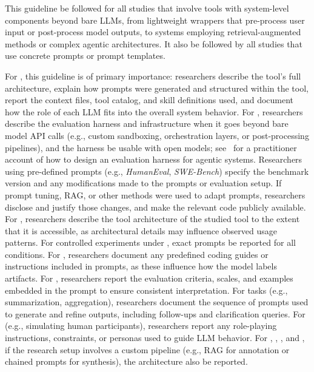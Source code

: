 
This guideline \must be followed for all studies that involve tools with system-level components beyond bare LLMs, from lightweight wrappers that pre-process user input or post-process model outputs, to systems employing retrieval-augmented methods or complex agentic architectures.
It also \must be followed by all studies that use concrete prompts or prompt templates.

For \newtools, this guideline is of primary importance: researchers \must describe the tool's full architecture, explain how prompts were generated and structured within the tool, report the context files, tool catalog, and skill definitions used, and document how the role of each LLM fits into the overall system behavior.
For \benchmarkingtasks, researchers \must describe the evaluation harness and infrastructure when it goes beyond bare model API calls (e.g., custom sandboxing, orchestration layers, or post-processing pipelines), and the harness \should be usable with open models; see~\cite{Anthropic2025evals} for a practitioner account of how to design an evaluation harness for agentic systems.
Researchers using pre-defined prompts (e.g., \emph{HumanEval}, \emph{SWE-Bench}) \must specify the benchmark version and any modifications made to the prompts or evaluation setup.
If prompt tuning, RAG, or other methods were used to adapt prompts, researchers \must disclose and justify those changes, and \should make the relevant code publicly available.
For \llmusage, researchers \should describe the tool architecture of the studied tool to the extent that it is accessible, as architectural details may influence observed usage patterns.
For controlled experiments under \llmusage, exact prompts \must be reported for all conditions.
For \annotators, researchers \must document any predefined coding guides or instructions included in prompts, as these influence how the model labels artifacts.
For \judges, researchers \must report the evaluation criteria, scales, and examples embedded in the prompt to ensure consistent interpretation.
For \synthesis tasks (e.g., summarization, aggregation), researchers \must document the sequence of prompts used to generate and refine outputs, including follow-ups and clarification queries.
For \subjects (e.g., simulating human participants), researchers \must report any role-playing instructions, constraints, or personas used to guide LLM behavior.
For \annotators, \judges, \synthesis, and \subjects, if the research setup involves a custom pipeline (e.g., RAG for annotation or chained prompts for synthesis), the architecture \should also be reported.

